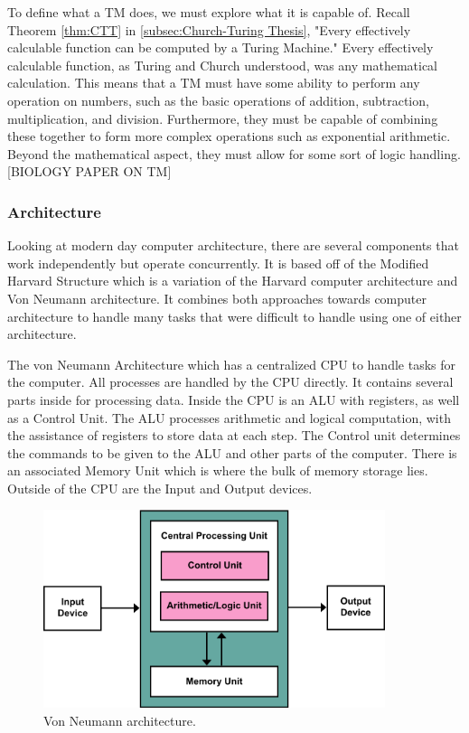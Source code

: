 To define what a TM does, we must explore what it is capable of.
Recall Theorem \ref{thm:CTT} in \ref{subsec:Church-Turing Thesis}, "Every effectively calculable function can be computed by a Turing Machine."
Every effectively calculable function, as Turing and Church understood, was any mathematical calculation.
This means that a TM must have some ability to perform any operation on numbers, such as the basic operations of addition, subtraction, multiplication, and division.
Furthermore, they must be capable of combining these together to form more complex operations such as exponential arithmetic.
Beyond the mathematical aspect, they must allow for some sort of logic handling.
[BIOLOGY PAPER ON TM]

\subsubsection{Architecture}\label{subsubsec:Arch}

Looking at modern day computer architecture, there are several components that work independently but operate concurrently.
It is based off of the Modified Harvard Structure which is a variation of the Harvard computer architecture and Von Neumann architecture.
It combines both approaches towards computer architecture to handle many tasks that were difficult to handle using one of either architecture.

The von Neumann Architecture which has a centralized CPU to handle tasks for the computer.
All processes are handled by the CPU directly.
It contains several parts inside for processing data.
Inside the CPU is an ALU with registers, as well as a Control Unit.
The ALU processes arithmetic and logical computation, with the assistance of registers to store data at each step.
The Control unit determines the commands to be given to the ALU and other parts of the computer.
There is an associated Memory Unit which is where the bulk of memory storage lies.
Outside of the CPU are the Input and Output devices.

\begin{figure}[htb]
    \centering
    \includegraphics[width=10cm]{Images/Von_Neumann_Architecture.png}
       \caption{Von Neumann architecture.}
           \label{Fig:VonNeumannArch}
\end{figure}

